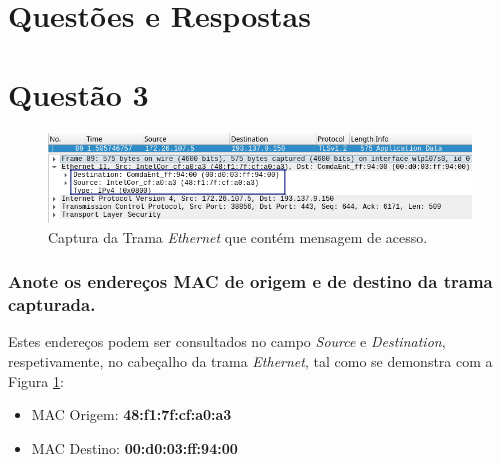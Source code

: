 

\section*{\hfil Questões e Respostas\hfil}



\section{Questão 3}

\begin{figure}[H]
\centering
\includegraphics[width=500pt]{prints/Questao3/questao3.tramaClient.png}
\caption{Captura da Trama \textit{Ethernet} que contém mensagem de acesso.} \label{questao3-1}
\end{figure}


\subsubsection{Anote os endereços MAC de origem e de destino da trama capturada.}

    \par Estes endereços podem ser consultados no campo \textit{Source} e \textit{Destination}, respetivamente, no cabeçalho da trama \textit{Ethernet}, tal como se demonstra com a Figura \ref{questao3-1}:

    \begin{multicols}{2}
    \begin{itemize}
        \item MAC Origem: \textbf{48:f1:7f:cf:a0:a3}  
        \item MAC Destino: \textbf{00:d0:03:ff:94:00}
    \end{itemize}
    \end{multicols}
    




\paragraph{}
